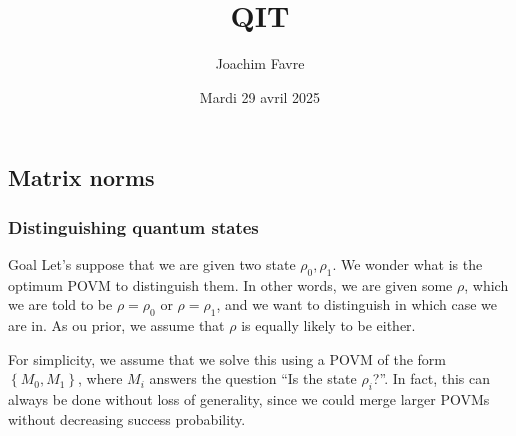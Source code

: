 \documentclass[a4paper]{article}
\title{QIT}
\author{Joachim Favre}
\date{Mardi 29 avril 2025}
\begin{document}
\maketitle


\subsection{Matrix norms}
\subsubsection{Distinguishing quantum states}

\begin{parag}{Goal}
    Let's suppose that we are given two state $\rho_0, \rho_1$. We wonder what is the optimum POVM to distinguish them. In other words, we are given some $\rho$, which we are told to be $\rho = \rho_0$ or $\rho = \rho_1$, and we want to distinguish in which case we are in. As ou prior, we assume that $\rho$ is equally likely to be either. 

    For simplicity, we assume that we solve this using a POVM of the form $\left\{M_0, M_1\right\}$, where $M_i$ answers the question ``Is the state $\rho_i$?''. In fact, this can always be done without loss of generality, since we could merge larger POVMs without decreasing success probability.
\end{parag}
\end{document}
